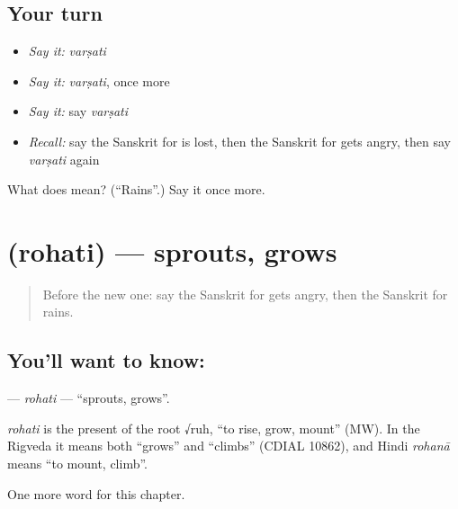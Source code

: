 \subsection*{Your turn}
\begin{itemize}
\raggedright
  \item \emph{Say it:} \emph{varṣati}
  \item \emph{Say it:} \emph{varṣati}, once more
  \item \emph{Say it:} say \emph{varṣati}
  \item \emph{Recall:} say the Sanskrit for is lost, then the Sanskrit for gets angry, then say \emph{varṣati} again
\end{itemize}

\begin{tcolorbox}[breakable,colback=teal!4,colframe=teal!35!black,title={Before you move on}]
What does  mean? (\textquotedblleft{}Rains\textquotedblright{}.) Say it once more.
\end{tcolorbox}
\section[\texorpdfstring{\sk{रोहति} (rohati)}{रोहति (rohati)}]{ (rohati) — sprouts, grows}

\label{lesson:SA-C233-rohati}



\begin{quote}
Before the new one: say the Sanskrit for gets angry, then the Sanskrit for rains.
\end{quote}

\subsection*{You'll want to know: }
\textbf{} — \emph{rohati} — \textquotedblleft{}sprouts, grows\textquotedblright{}.

\begin{cousinweb}
\emph{rohati} is the present of the root √ruh, \textquotedblleft{}to rise, grow, mount\textquotedblright{} (MW). In the Rigveda it means both \textquotedblleft{}grows\textquotedblright{} and \textquotedblleft{}climbs\textquotedblright{} (CDIAL 10862), and Hindi \emph{rohanā} means \textquotedblleft{}to mount, climb\textquotedblright{}.
\end{cousinweb}

\begin{grammarlens}[title={What you've built}]
One more word for this chapter.
\end{grammarlens}


